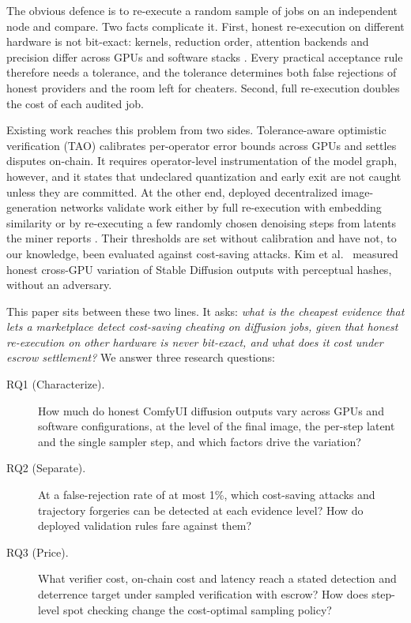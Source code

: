 \documentclass[preprint,review,12pt,authoryear]{elsarticle}
\theoremstyle{definition}
\begin{document}
The obvious defence is to re-execute a random sample of jobs on an independent node and compare. Two facts complicate it. First, honest re-execution on different hardware is not bit-exact: kernels, reduction order, attention backends and precision differ across GPUs and software stacks \citep{diffusers_repro,atil2024nondeterminism,yuan2025nondeterminism}. Every practical acceptance rule therefore needs a tolerance, and the tolerance determines both false rejections of honest providers and the room left for cheaters. Second, full re-execution doubles the cost of each audited job.

Existing work reaches this problem from two sides. Tolerance-aware optimistic verification (TAO) \citep{yao2026tao} calibrates per-operator error bounds across GPUs and settles disputes on-chain. It requires operator-level instrumentation of the model graph, however, and it states that undeclared quantization and early exit are not caught unless they are committed. At the other end, deployed decentralized image-generation networks validate work either by full re-execution with embedding similarity \citep{nicheimage_repo} or by re-executing a few randomly chosen denoising steps from latents the miner reports \citep{wombo_repo}. Their thresholds are set without calibration and have not, to our knowledge, been evaluated against cost-saving attacks. Kim et al.\ \citep{kim2024reproducibility} measured honest cross-GPU variation of Stable Diffusion outputs with perceptual hashes, without an adversary.

This paper sits between these two lines. It asks: \emph{what is the cheapest evidence that lets a marketplace detect cost-saving cheating on diffusion jobs, given that honest re-execution on other hardware is never bit-exact, and what does it cost under escrow settlement?} We answer three research questions:
\begin{description}
\item[RQ1 (Characterize).] How much do honest ComfyUI diffusion outputs vary across GPUs and software configurations, at the level of the final image, the per-step latent and the single sampler step, and which factors drive the variation?
\item[RQ2 (Separate).] At a false-rejection rate of at most 1\%, which cost-saving attacks and trajectory forgeries can be detected at each evidence level? How do deployed validation rules fare against them?
\item[RQ3 (Price).] What verifier cost, on-chain cost and latency reach a stated detection and deterrence target under sampled verification with escrow? How does step-level spot checking change the cost-optimal sampling policy?
\end{description}
\end{document}
